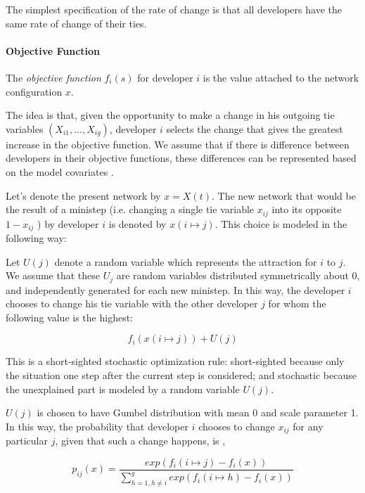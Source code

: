 \documentclass[12pt]{report}
\begin{document}
The simplest specification of the rate of change is that all developers have the same rate of change of their ties. 

\paragraph*{Objective Function}

The \textit{objective function} $f_i(s)$ for developer $i$ is the value attached to the network configuration $x$. 

The idea is that, given the opportunity to make a change in his outgoing tie variables $(X_{i1},...,X_{ig})$, developer $i$ selects the change that gives the greatest increase in the objective function. We assume that if there is difference between developers in their objective functions, these differences can be represented based on the model covariates \cite{Snijders2004}. 

Let's denote the present network by $x = X(t)$. The new network that would be the result of a ministep (i.e. changing a single tie variable $x_{ij}$ into its opposite $1 - x_{ij}$ ) by developer $i$ is denoted by $x(i \mapsto j)$. This choice is modeled in the following way: 

Let $U(j)$ denote a random variable which represents the attraction for $i$ to $j$. We assume that these $U_j$ are random variables distributed symmetrically about 0, and independently generated for each new ministep. In this way, the developer $i$ chooses to change his tie variable with the other developer $j$ for whom the following value \cite{Snijders2004} is the highest:

\begin{equation}
f_i(x(i \mapsto j)) + U(j)
\end{equation} 

This is a short-sighted stochastic optimization rule: short-sighted because only the situation one step after the current step is considered; and stochastic because the unexplained part is modeled by a random variable $U(j)$. 

$U(j)$ is chosen to have Gumbel distribution with mean 0 and scale parameter 1. In this way, the probability that developer $i$ chooses to change $x_{ij}$ for any particular $j$, given that such a change happens, is \cite{Snijders2004},

\begin{equation}
p_{ij}(x) = \frac{exp(f_i(i \mapsto j) - f_i(x))}{\sum_{h=1, h \neq i}^{g} exp(f_i(i \mapsto h) - f_i(x))}
\end{equation}
\end{document}
